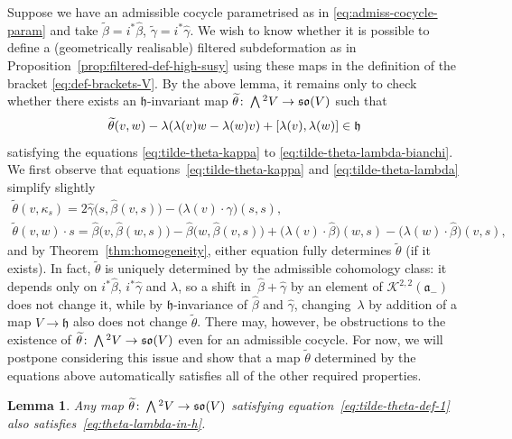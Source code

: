 \documentclass[11pt]{article}
\numberwithin{equation}{section}
\numberwithin{equation}{section}
\newtheorem{Lemma}[Theorem]{Lemma}
\newcommand{\fa}{\mathfrak{a}}
\newcommand{\fh}{\mathfrak{h}}
\newcommand{\fso}{\mathfrak{so}}
\newcommand{\cK}{\mathcal{K}}
\newcommand{\betahat}{\widehat{\beta}}
\newcommand{\gammahat}{\widehat{\gamma}}
\newcommand{\betatilde}{\widetilde{\beta}}
\newcommand{\gammatilde}{\widetilde{\gamma}}
\newcommand{\thetatilde}{\widetilde{\theta}}
\newcommand{\Wedge}{\mathchoice{{\textstyle\bigwedge}}{\bigwedge}{\bigwedge}{\bigwedge}}	%
\newcommand{\1}{\mathbbm{1}}
\begin{document}
Suppose we have an admissible cocycle parametrised as in \eqref{eq:admiss-cocycle-param} and take $\betatilde=i^*\betahat$, $\gammatilde=i^*\gammahat$. We wish to know whether it is possible to define a (geometrically realisable) filtered subdeformation as in Proposition~\ref{prop:filtered-def-high-susy} using these maps in the definition of the bracket \eqref{eq:def-brackets-V}. By the above lemma, it remains only to check whether there exists an $\fh$-invariant map $\thetatilde\colon \Wedge^2V\to \fso(V)$ such that
\begin{equation}\label{eq:theta-lambda-in-h}
	\thetatilde(v,w) - \lambda(\lambda(v)w-\lambda(w)v) + \comm{\lambda(v)}{\lambda(w)} \in \fh
\end{equation}
satisfying the equations \eqref{eq:tilde-theta-kappa} to \eqref{eq:tilde-theta-lambda-bianchi}. We first observe that equations~\eqref{eq:tilde-theta-kappa} and \eqref{eq:tilde-theta-lambda} simplify slightly
\begin{gather}
	\thetatilde(v,\kappa_s) = 2\gammahat\bigl(s,\betahat(v,s)\bigr) - \bigl(\lambda(v)\cdot\gammahat\bigr)(s,s),
	\label{eq:tilde-theta-def-1}\\
		\thetatilde(v,w)\cdot s
		= \betahat\bigl(v,\betahat(w,s)\bigr) - \betahat\bigl(w,\betahat(v,s)\bigr) + \bigl(\lambda(v)\cdot\betahat\bigr)(w,s) - \bigl(\lambda(w)\cdot\betahat\bigr)(v,s),
		\label{eq:tilde-theta-act-s}
\end{gather}
and by Theorem~\ref{thm:homogeneity}, either equation fully determines $\thetatilde$ (if it exists). In fact, $\thetatilde$ is uniquely determined by the admissible cohomology class: it depends only on $i^*\betahat$, $i^*\gammahat$ and $\lambda$, so a shift in~${\betahat+\gammahat}$ by an element of $\cK^{2,2}(\fa_-)$ does not change it, while by $\fh$-invariance of $\betahat$ and $\gammahat$, changing~$\lambda$ by addition of a map $V\to\fh$ also does not change $\thetatilde$. There may, however, be obstructions to the existence of $\thetatilde\colon\Wedge^2 V\to \fso(V)$ even for an admissible cocycle. For now, we will postpone considering this issue and show that a map $\thetatilde$ determined by the equations above automatically satisfies all of the other required properties.

\begin{Lemma}\label{lemma:theta-lambda-in-h}
	Any map $\thetatilde\colon\Wedge^2V\to \fso(V)$ satisfying equation~\eqref{eq:tilde-theta-def-1} also satisfies~\eqref{eq:theta-lambda-in-h}.
\end{Lemma}
\end{document}
